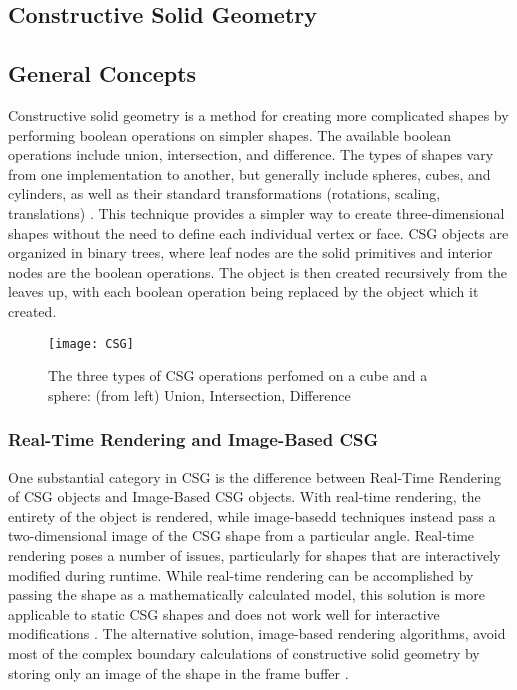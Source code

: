 \documentclass[12pt]{article}
\begin{document}
\begin{doublespace}
\section{Constructive Solid Geometry}
\subsection{General Concepts}
Constructive solid geometry is a method for creating more complicated shapes by performing boolean operations on simpler shapes. The available boolean operations include union, intersection, and difference. The types of shapes vary from one implementation to another, but generally include spheres, cubes, and cylinders, as well as their standard transformations (rotations, scaling, translations) \cite{cs_dictionary}. This technique provides a simpler way to create three-dimensional shapes without the need to define each individual vertex or face. CSG objects are organized in binary trees, where leaf nodes are the solid primitives and interior nodes are the boolean operations. The object is then created recursively from the leaves up, with each boolean operation being replaced by the object which it created\cite{gold}.

\begin{figure}[h]
  \texttt{[image: CSG]}
  \centering
  \caption{The three types of CSG operations perfomed on a cube and a sphere: (from left) Union, Intersection, Difference}
\end{figure}
\subsubsection{Real-Time Rendering and Image-Based CSG}
One substantial category in CSG is the difference between Real-Time Rendering of CSG objects and Image-Based CSG objects. With real-time rendering, the entirety of the object is rendered, while image-basedd techniques instead pass a two-dimensional image of the CSG shape from a particular angle. Real-time rendering poses a number of issues, particularly for shapes that are interactively modified during runtime. While real-time rendering can be accomplished by passing the shape as a mathematically calculated model, this solution is more applicable to static CSG shapes and does not work well for interactive modifications \cite{open_csg}. The alternative solution, image-based rendering algorithms, avoid most of the complex boundary calculations of constructive solid geometry by storing only an image of the shape in the frame buffer \cite{open_csg}.

\end{doublespace}
\end{document}
